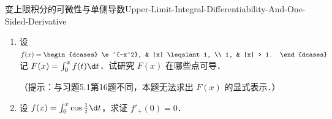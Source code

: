 \begin{problem}{变上限积分的可微性与单侧导数}{Upper-Limit-Integral-Differentiability-And-One-Sided-Derivative}
    \begin{enumerate}
        \item 设 $f(x) = \begin{dcases} \e^{-x^2}, & |x| \leqslant 1, \\ 1, & |x| > 1. \end{dcases}$ 记 $F(x) = \int_0^x f(t) \d t$．试研究 $F(x)$ 在哪些点可导．

              （提示：与习题5.1第16题不同，本题无法求出 $F(x)$ 的显式表示．）
        \item 设 $f(x) = \int_0^x \cos \frac{1}{t} \d t$，求证 $f'_+(0) = 0$．
    \end{enumerate}
\end{problem}

